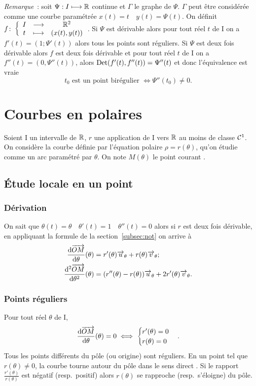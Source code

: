 \emph{Remarque}~:
soit \(\Psi : I \longmapsto \mathbb{R}\) continue et \(\Gamma\) le graphe de \(\Psi\). \(\Gamma\) peut être considérée comme une courbe paramétrée \(x(t)=t \quad y(t)=\Psi(t)\). On définit \(f\colon \left\{\begin{array}{ccc} I & \longrightarrow &\mathbb{R}^2\\ t & \longmapsto & (x(t),y(t)) \end{array} \right.\). Si \(\Psi\) est dérivable alors pour tout réel \(t\) de I on a \(f'(t)=(1;\Psi'(t))\) alors tous les points sont réguliers. Si \(\Psi\) est deux fois dérivable alors \(f\) est deux fois dérivable et pour tout réel \(t\) de I on a \(f''(t)=(0,\Psi''(t))\), alors \(\operatorname{Det}(f'(t),f''(t))=\Psi''(t)\) et donc l'équivalence est vraie
\begin{equation}
 t_0 \text{~est un point birégulier } \iff \Psi''(t_0) \neq 0.
\end{equation}

\section{Courbes en polaires}
Soient I un intervalle de \(\mathbb{R}\), \(r\) une application de I vers \(\mathbb{R}\) au moins de classe \(\mathcal{C}^{1}\). On considère la courbe définie par l'équation polaire \(\rho=r(\theta)\), qu'on étudie comme un arc paramétré par \(\theta\). On note \(M(\theta)\) le point \og courant \fg{}.

\subsection{Étude locale en un point}
\subsubsection{Dérivation}
On sait que \(\theta(t)=\theta \quad \theta'(t)=1 \quad \theta''(t)=0\) alors si \(r\) est deux fois dérivable, en appliquant la formule de la section~\ref{subsec:not} on arrive à
\begin{align}
 \dfrac{\mathrm{d} \overrightarrow{OM}}{\mathrm{d} \theta}(\theta)&=r'(\theta) \overrightarrow{u}_\theta + r(\theta) \overrightarrow{v}_\theta;\\
 \dfrac{\mathrm{d}^2 \overrightarrow{OM}}{\mathrm{d} {\theta}^2}(\theta)&=(r''(\theta)-r(\theta)) \overrightarrow{u}_\theta + 2r'(\theta) \overrightarrow{v}_\theta.
\end{align}

\subsubsection{Points réguliers}
Pour tout réel \(\theta\) de I,
\begin{equation}
 \dfrac{\mathrm{d} \overrightarrow{OM}}{\mathrm{d} \theta}(\theta)=0 \iff
 \begin{cases}
   r'(\theta) = 0 \\ r(\theta)=0
 \end{cases}.
\end{equation}
Tous les points différents du pôle (ou origine) sont réguliers. En un point tel que \(r(\theta) \neq 0\), la courbe \og tourne autour du pôle dans le sens direct \fg{}. Si le rapport \(\frac{r'(\theta)}{r(\theta)}\) est négatif (resp.\ positif) alors \(r(\theta)\) se rapproche (resp.\ s'éloigne) du pôle.

